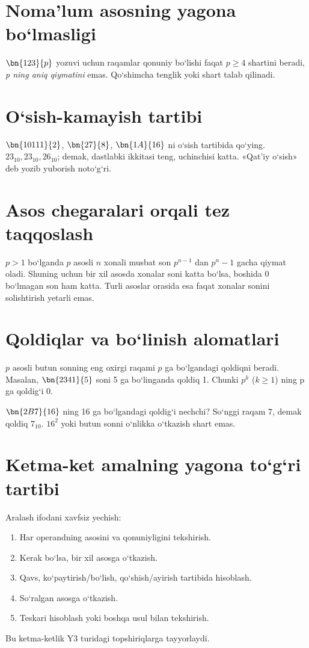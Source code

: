 \documentclass[11pt,a4paper,openany,oneside]{book}
\begin{document}
\section{Noma’lum asosning yagona bo‘lmasligi}
\(\bn{123}{p}\) yozuvi uchun raqamlar qonuniy bo‘lishi faqat \(p\ge4\) shartini beradi, \emph{p ning aniq qiymatini} emas. Qo‘shimcha tenglik yoki shart talab qilinadi.
\section{O‘sish-kamayish tartibi}
\begin{worked}
\(\bn{10111}{2}\), \(\bn{27}{8}\), \(\bn{1A}{16}\) ni o‘sish tartibida qo‘ying. \(23_{10},23_{10},26_{10}\); demak, dastlabki ikkitasi teng, uchinchisi katta. «Qat’iy o‘sish» deb yozib yuborish noto‘g‘ri.
\end{worked}
\section{Asos chegaralari orqali tez taqqoslash}
\(p>1\) bo‘lganda \(p\) asosli \(n\) xonali musbat son \(p^{n-1}\) dan \(p^n-1\) gacha qiymat oladi. Shuning uchun bir xil asosda xonalar soni katta bo‘lsa, boshida 0 bo‘lmagan son ham katta. Turli asoslar orasida esa faqat xonalar sonini solishtirish yetarli emas.
\section{Qoldiqlar va bo‘linish alomatlari}
\(p\) asosli butun sonning eng oxirgi raqami \(p\) ga bo‘lgandagi qoldiqni beradi. Masalan, \(\bn{2341}{5}\) soni 5 ga bo‘linganda qoldiq 1. Chunki \(p^k\) (\(k\ge1\)) ning p ga qoldig‘i 0.
\begin{worked}
\(\bn{2B7}{16}\) ning 16 ga bo‘lgandagi qoldig‘i nechchi? So‘nggi raqam \(7\), demak qoldiq \(7_{10}\). \(16^2\) yoki butun sonni o‘nlikka o‘tkazish shart emas.
\end{worked}
\section{Ketma-ket amalning yagona to‘g‘ri tartibi}
Aralash ifodani xavfsiz yechish:
\begin{enumerate}
\item Har operandning asosini va qonuniyligini tekshirish.
\item Kerak bo‘lsa, bir xil asosga o‘tkazish.
\item Qavs, ko‘paytirish/bo‘lish, qo‘shish/ayirish tartibida hisoblash.
\item So‘ralgan asosga o‘tkazish.
\item Teskari hisoblash yoki boshqa usul bilan tekshirish.
\end{enumerate}
Bu ketma-ketlik Y3 turidagi topshiriqlarga tayyorlaydi.
\end{document}
